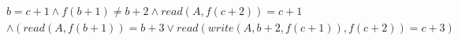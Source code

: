 \begin{align*}
%
& %
b = c + 1
%
\land
%
f(b + 1)  \neq  b + 2
%
\land
%
\mathit{read}(A,f(c + 2)) = c + 1
~\\~
& %
%
\land
%
(\mathit{read}(A,f(b + 1)) = b + 3 \lor \mathit{read}(\mathit{write}(A,b + 2,f(c + 1)),f(c + 2)) = c + 3)
%
\end{align*}

